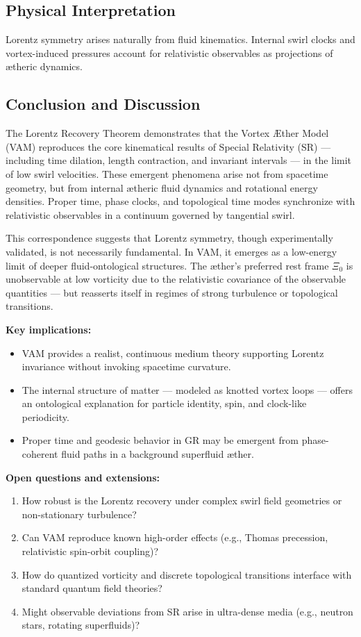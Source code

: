     \subsection*{Physical Interpretation}
    Lorentz symmetry arises naturally from fluid kinematics. Internal swirl clocks and vortex-induced pressures account for relativistic observables as projections of ætheric dynamics.

    \subsection{Conclusion and Discussion}

    The Lorentz Recovery Theorem demonstrates that the Vortex Æther Model (VAM) reproduces the core kinematical results of Special Relativity (SR) — including time dilation, length contraction, and invariant intervals — in the limit of low swirl velocities. These emergent phenomena arise not from spacetime geometry, but from internal ætheric fluid dynamics and rotational energy densities. Proper time, phase clocks, and topological time modes synchronize with relativistic observables in a continuum governed by tangential swirl.

    This correspondence suggests that Lorentz symmetry, though experimentally validated, is not necessarily fundamental. In VAM, it emerges as a low-energy limit of deeper fluid-ontological structures. The æther's preferred rest frame \( \Xi_0 \) is unobservable at low vorticity due to the relativistic covariance of the observable quantities — but reasserts itself in regimes of strong turbulence or topological transitions.

    \textbf{Key implications:}
    \begin{itemize}
        \item VAM provides a realist, continuous medium theory supporting Lorentz invariance without invoking spacetime curvature.
        \item The internal structure of matter — modeled as knotted vortex loops — offers an ontological explanation for particle identity, spin, and clock-like periodicity.
        \item Proper time and geodesic behavior in GR may be emergent from phase-coherent fluid paths in a background superfluid æther.
    \end{itemize}

    \textbf{Open questions and extensions:}
    \begin{enumerate}
        \item How robust is the Lorentz recovery under complex swirl field geometries or non-stationary turbulence?
        \item Can VAM reproduce known high-order effects (e.g., Thomas precession, relativistic spin-orbit coupling)?
        \item How do quantized vorticity and discrete topological transitions interface with standard quantum field theories?
        \item Might observable deviations from SR arise in ultra-dense media (e.g., neutron stars, rotating superfluids)?
    \end{enumerate}

